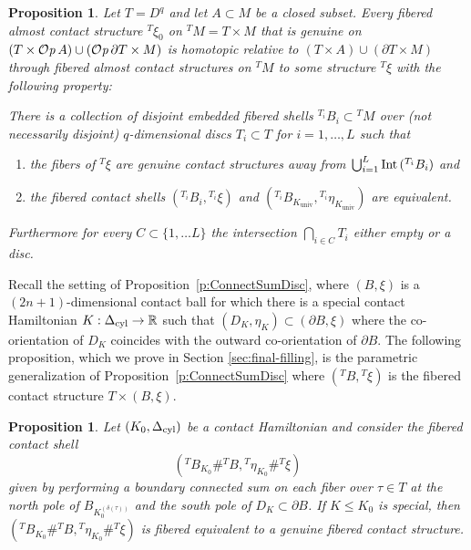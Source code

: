 \documentclass[12pt]{paper}
\theoremstyle{plain}
\newtheorem{proposition}[theorem]{Proposition}
\newtheorem{prop}[theorem]{Proposition}
\theoremstyle{definition}
\newcommand{\p}{\partial}
\newcommand{\R}{{\mathbb{R}}}
\newcommand{\cyl}{{\rm cyl}}
\newcommand{\Int}{{\rm Int\,}} %
\newcommand{\univ}{\mathrm{univ}}
\def\Op{{\mathcal O}{\it p}\,}
\numberwithin{figure}{section}
\begin{document}
 \begin{proposition}\label{prop:unique-model-param}
Let $T = D^q$ and let $A \subset M$ be a closed subset.
Every fibered almost contact structure ${}^T\xi_0$ on ${}^TM = T \times M$
that is genuine on $(T\times\Op A)\cup (\Op\p T \times M)$ is homotopic relative to 
$(T\times A) \cup (\p T \times M)$ through fibered almost contact structures on ${}^TM$ 
to some structure ${}^T\xi$ with the following property:

There is a collection of disjoint  embedded fibered shells ${}^{T_i}B_i \subset {}^TM$ 
 over (not necessarily disjoint) $q$-dimensional discs $T_i \subset T$ for $i = 1, \dots, L$ such that 
\begin{enumerate}
	\item 
	the fibers of ${}^T\xi$ are genuine contact structures away from $\bigcup_{i=1}^L \Int({}^{T_i} B_i)$ and
	\item the fibered contact shells
	$({}^{T_i}B_i, {}^{T_i}\xi)$ and $({}^{T_i} B_{K_{\univ}}, {}^{T_i}\eta_{K_{\univ}})$
	are equivalent.
\end{enumerate}
Furthermore for every $C \subset \{1, \dots L\}$ the intersection $\bigcap_{i \in C} T_i$ either empty or a disc. 
\end{proposition}




Recall the setting of Proposition~\ref{p:ConnectSumDisc}, where 
$(B,\xi)$ is a $(2n+1)$-dimensional contact ball for which there is a 
special contact Hamiltonian $K: \Delta_\cyl \to \R$ such that
$(D_{K}, \eta_{K}) \subset (\p B, \xi)$ where the co-orientation of $D_{K}$ coincides with the 
outward co-orientation of $\p B$. 
The following proposition, which we prove 
in Section \ref{sec:final-filling}, is the parametric generalization of Proposition~\ref{p:ConnectSumDisc}
where $({}^T B,{}^T\xi)$  is the fibered contact structure $T\times(B,\xi)$.

  
   
\begin{prop}\label{p:ConnectSumDisc-param}
	Let $(K_0, \Delta_{\cyl})$ be a contact Hamiltonian and consider the fibered contact shell 
	$$({}^TB_{K_0} \# {}^TB, {}^T\eta_{K_0} \# {}^T\xi)$$
	given by performing a boundary connected sum on each fiber over $\tau \in T$ at the north pole of 
	$B_{K^{(\delta(\tau))}_0}$ and the south pole of $D_{K} \subset \p B$.  If $K \leq K_0$ is special, then
	$({}^TB_{K_0} \# {}^TB, {}^T\eta_{K_0} \# {}^T\xi)$ is fibered equivalent to a  genuine fibered contact structure.
\end{prop}
	 
\end{document}
